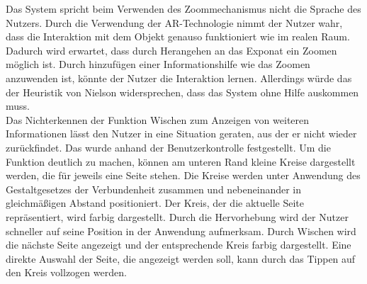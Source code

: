 \documentclass[runningheads,a4paper, 12pt]{llncs}
\begin{document}
Das System spricht beim Verwenden des Zoommechanismus nicht die Sprache des Nutzers. Durch die Verwendung der AR-Technologie nimmt der Nutzer wahr, dass die Interaktion mit dem Objekt genauso funktioniert wie im realen Raum. Dadurch wird erwartet, dass durch Herangehen an das Exponat ein Zoomen möglich ist. Durch hinzufügen einer Informationshilfe wie das Zoomen anzuwenden ist, könnte der Nutzer die Interaktion lernen. Allerdings würde das der Heuristik von Nielson \cite{Nielsen.1994} widersprechen, dass das System ohne Hilfe auskommen muss.\\

Das Nichterkennen der Funktion Wischen zum Anzeigen von weiteren Informationen lässt den Nutzer in eine Situation geraten, aus der er nicht wieder zurückfindet. Das wurde anhand der Benutzerkontrolle festgestellt. Um die Funktion deutlich zu machen, können am unteren Rand kleine Kreise dargestellt werden, die für jeweils eine Seite stehen. Die Kreise werden unter Anwendung des Gestaltgesetzes der Verbundenheit zusammen und nebeneinander in gleichmäßigen Abstand positioniert. Der Kreis, der die aktuelle Seite repräsentiert, wird farbig dargestellt. Durch die Hervorhebung wird der Nutzer schneller auf seine Position in der Anwendung aufmerksam. Durch Wischen wird die nächste Seite angezeigt und der entsprechende Kreis farbig dargestellt. Eine direkte Auswahl der Seite, die angezeigt werden soll, kann durch das Tippen auf den Kreis vollzogen werden.\\
\end{document}
